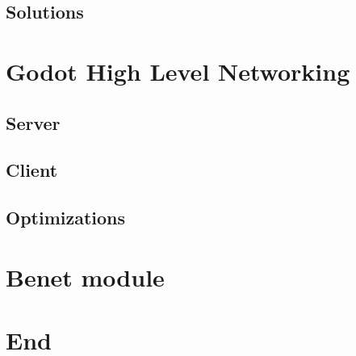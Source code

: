 \documentclass{beamer}
\begin{document}
\subsection{Solutions}



\section{Godot High Level Networking}


\subsection{Server}

\subsection{Client}

\subsection{Optimizations}


\section{Benet module}


\section{End}

\end{document}
